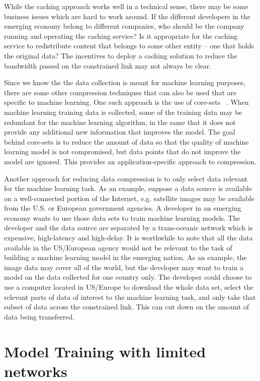 While the caching approach works well in a technical sense, there may be some business issues which are hard to work around. If the different developers in the emerging economy belong to different companies, who should be the company running and operating the caching service? Is it appropriate for the caching service to redistribute content that belongs to some other entity -- one that holds the original data? The incentives to deploy a caching solution to reduce the bandwidth passed on the constrained link may not always be clear.   

Since we know the the data collection is meant for machine learning purposes, there are some other compression techniques that can also be used that are specific to machine learning. One such approach is the use of core-sets ~\cite{ mirzasoleiman2020coresets, lu2020robust}. When machine learning training data is collected, some of the training data may be redundant for the machine learning algorithm, in the same that it does not provide any additional new information that improves the model. The goal behind core-sets is to reduce the amount of data so that the quality of machine learning model is not compromised, but data points that do not improve the model are ignored. This provides an application-specific approach to compression. 

Another approach for reducing data compression is to only select data relevant for the machine learning task. As an example, suppose a data source is available on a well-connected portion of the Internet, e.g. satellite images may be available from the U.S. or European government agencies. A developer in an emerging economy wants to use those data sets to train machine learning models. The developer and the data source are separated by a trans-oceanic network which is expensive, high-latency and high-delay. It is worthwhile to note that all the data available in the US/European agency would not be relevant to the task of building a machine learning model in the emerging nation. As an example, the image data may cover all of the world, but the developer may want to train a model on the data collected for one country only. The developer could choose to use a computer located in US/Europe to download the whole data set, select the relevant parts of data of interest to the machine learning task, and only take that subset of data across the constrained link. This can cut down on the amount of data being transferred. 

\section{Model Training with limited networks}
\label{sec:limited_network:training}

